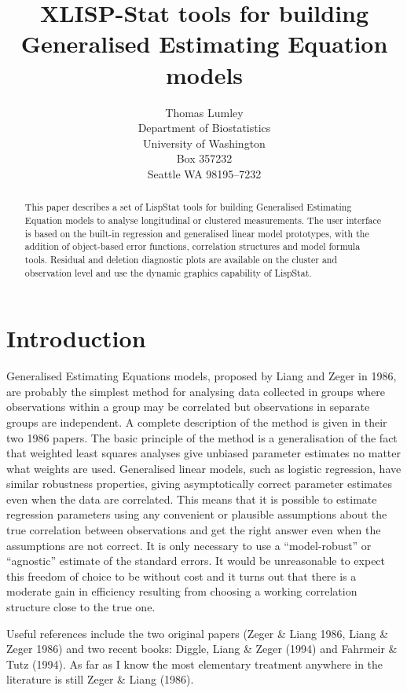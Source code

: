 \documentclass[10pt]{article}
\title{XLISP-Stat tools for building Generalised Estimating Equation models}
\author{Thomas Lumley\\ Department of Biostatistics\\University of Washington\\Box 357232\\Seattle WA 98195--7232}
\begin{document}
\maketitle
\begin{abstract}
This paper describes a set of LispStat tools for building Generalised Estimating Equation models to analyse longitudinal or clustered measurements.  The user interface is based on the built-in regression and generalised linear model prototypes, with the addition of object-based error functions, correlation structures and model formula tools. Residual and deletion diagnostic plots are available on the cluster and observation level and use the dynamic graphics capability of LispStat.
\end{abstract}
\section{Introduction}
Generalised Estimating Equations models, proposed by Liang and Zeger in 1986, are probably the simplest method for analysing data collected in groups where observations within a group may be correlated but observations in separate groups are independent.  A complete description of the method is given in their two 1986 papers.  The basic principle of the method is a generalisation of the fact that weighted least squares analyses give unbiased parameter estimates no matter what weights are used.  Generalised linear models, such as logistic regression, have similar robustness properties, giving asymptotically correct parameter estimates even when the data are correlated.  This means that it is possible to estimate regression parameters using any convenient or plausible assumptions about the true correlation between observations and get the right answer even when the assumptions are not correct.  It is only necessary to use a ``model-robust'' or ``agnostic'' estimate of the standard errors.  It would be unreasonable to expect this freedom of choice to be without cost and it turns out that there is a moderate gain in efficiency resulting from choosing a working correlation structure close to the true one.

Useful references include the two original papers (Zeger \& Liang  1986, Liang \& Zeger 1986) and two recent books: Diggle, Liang \& Zeger (1994) and Fahrmeir \& Tutz (1994). As far as I know the most elementary treatment anywhere in the literature is still Zeger \& Liang (1986).
\end{document}
